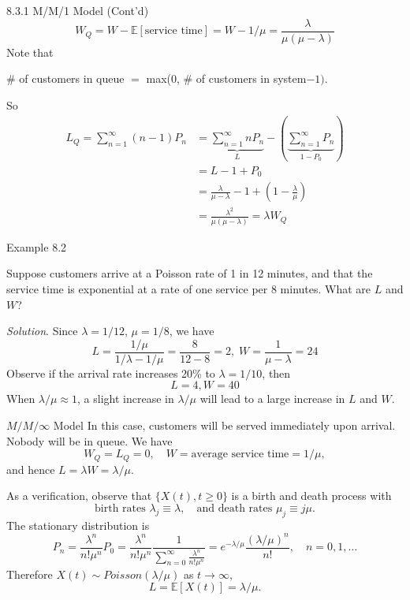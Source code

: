 \documentclass[letterpaper,handout]{beamer}
\def\Sum{\sum\nolimits}
\def\E{\mathbb E}
\begin{document}
\begin{frame}{8.3.1 M/M/1 Model (Cont'd)}
\[
W_Q = W - \E[\text{service time}]=W-1/\mu=\frac{\lambda}{\mu(\mu-\lambda)}
\]
Note that
\begin{center}
\# of customers in queue $=$ max(0, \# of customers in system$-1)$.
\end{center}

So
\begin{align*}
L_Q =\Sum_{n=1}^{\infty}(n-1)P_n&=\underbrace{\Sum_{n=1}^{\infty}nP_n}_{L}-(\underbrace{\Sum_{n=1}^{\infty}P_n}_{1-P_0})\\
&=L-1+P_0\\
&=\frac{\lambda}{\mu-\lambda}-1+\left(1-\frac{\lambda}{\mu}\right)\\
&=\frac{\lambda^2}{\mu(\mu-\lambda)}=\lambda W_Q
\end{align*}


\end{frame}
\begin{frame}{Example 8.2}

Suppose customers arrive at a Poisson rate of 1 in 12 minutes, and that the service time is exponential at a rate of one service per 8 minutes. What are $L$ and $W$?

{\em Solution}. Since $\lambda=1/12$, $\mu=1/8$, we have
$$L=\frac{1/\mu}{1/\lambda-1/\mu}=\frac{8}{12-8}=2,\; W=\frac{1}{\mu-\lambda}=24$$
Observe if the arrival rate increases 20\% to $\lambda= 1/10$, then
$$L = 4, W= 40$$
When $\lambda/\mu\approx 1$, a slight increase in $\lambda/\mu$ will lead to a large increase in $L$ and $W$.
\end{frame}
\begin{frame}{$M/M/\infty$ Model}
In this case, customers will be served immediately upon arrival. Nobody will be in queue. We have
$$W_Q=L_Q=0,\quad W=\text{average service time}=1/\mu,$$
and hence $L=\lambda W =\lambda/\mu.$\medskip

As a verification, observe that $\{X(t), t \ge 0\}$ is a birth and death process with
$$\text{birth rates }\lambda_j\equiv \lambda,\quad\text{and death rates }\mu_j\equiv j\mu.$$
The stationary distribution is
$$
P_n=\frac{\lambda^n}{n!\mu^n}P_0
=\frac{\lambda^n}{n!\mu^n}\frac{1}{\sum_{n=0}^{\infty}\frac{\lambda^n}{n!\mu^n}}
=e^{-\lambda/\mu}\frac{(\lambda/\mu)^n}{n!},\quad n=0,1,\ldots
$$
Therefore $X(t)\sim Poisson(\lambda/\mu)$ as $t\to\infty,$
$$L = \E[X(t)]=\lambda/\mu.$$
\end{frame}
\end{document}
